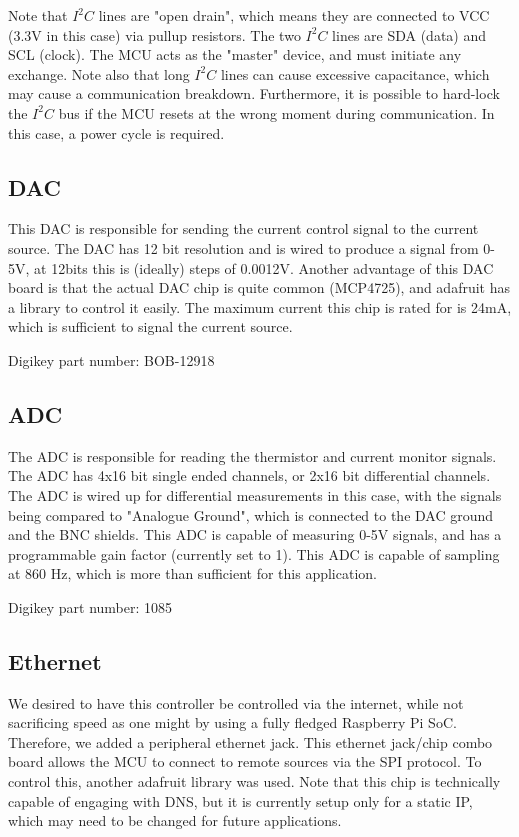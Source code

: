 \documentclass[11pt, letterpaper]{article}
\begin{document}
Note that $I^2 C$ lines are "open drain", which means they are connected to VCC (3.3V in this case) via pullup resistors. The two $I^2 C$ lines are SDA (data) and SCL (clock). The MCU acts as the "master" device, and must initiate any exchange. Note also that long $I^2 C$ lines can cause excessive capacitance, which may cause a communication breakdown. Furthermore, it is possible to hard-lock the $I^2 C$ bus if the MCU resets at the wrong moment during communication. In this case, a power cycle is required.

\subsection{DAC}

This DAC is responsible for sending the current control signal to the current source. The DAC has 12 bit resolution and is wired to produce a signal from 0-5V, at 12bits this is (ideally) steps of 0.0012V. Another advantage of this DAC board is that the actual DAC chip is quite common (MCP4725), and adafruit has a library to control it easily. The maximum current this chip is rated for is 24mA, which is sufficient to signal the current source.

Digikey part number: BOB-12918

\subsection{ADC}

The ADC is responsible for reading the thermistor and current monitor signals. The ADC has 4x16 bit single ended channels, or 2x16 bit differential channels. The ADC is wired up for differential measurements in this case, with the signals being compared to "Analogue Ground", which is connected to the DAC ground and the BNC shields. This ADC is capable of measuring 0-5V signals, and has a programmable gain factor (currently set to 1). This ADC is capable of sampling at 860 Hz, which is more than sufficient for this application.

Digikey part number: 1085

\subsection{Ethernet}

We desired to have this controller be controlled via the internet, while not sacrificing speed as one might by using a fully fledged Raspberry Pi SoC. Therefore, we added a peripheral ethernet jack. This ethernet jack/chip combo board allows the MCU to connect to remote sources via the SPI protocol. To control this, another adafruit library was used. Note that this chip is technically capable of engaging with DNS, but it is currently setup only for a static IP, which may need to be changed for future applications.
\end{document}
